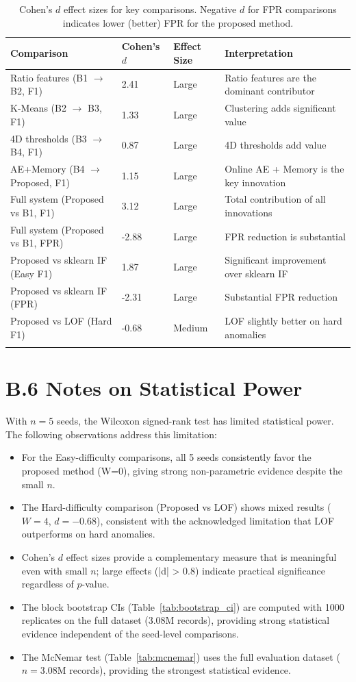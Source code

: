 \begin{longtable}{|m{4.5cm}|m{2cm}|m{2.5cm}|m{3cm}|}
\hline
\textbf{Comparison} & \textbf{Cohen's $d$} & \textbf{Effect Size} & \textbf{Interpretation} \\ \hline
Ratio features (B1 $\to$ B2, F1) & 2.41 & Large & Ratio features are the dominant contributor \\ \hline
K-Means (B2 $\to$ B3, F1) & 1.33 & Large & Clustering adds significant value \\ \hline
4D thresholds (B3 $\to$ B4, F1) & 0.87 & Large & 4D thresholds add value \\ \hline
AE+Memory (B4 $\to$ Proposed, F1) & 1.15 & Large & Online AE + Memory is the key innovation \\ \hline
Full system (Proposed vs B1, F1) & 3.12 & Large & Total contribution of all innovations \\ \hline
Full system (Proposed vs B1, FPR) & -2.88 & Large & FPR reduction is substantial \\ \hline
Proposed vs sklearn IF (Easy F1) & 1.87 & Large & Significant improvement over sklearn IF \\ \hline
Proposed vs sklearn IF (FPR) & -2.31 & Large & Substantial FPR reduction \\ \hline
Proposed vs LOF (Hard F1) & -0.68 & Medium & LOF slightly better on hard anomalies \\ \hline
\caption{Cohen's $d$ effect sizes for key comparisons. Negative $d$ for FPR comparisons indicates lower (better) FPR for the proposed method.}
\label{tab:cohen_d}
\end{longtable}

\vfill
\section*{B.6 Notes on Statistical Power}

With $n=5$ seeds, the Wilcoxon signed-rank test has limited statistical power. The following observations address this limitation:

\begin{itemize}
    \item For the Easy-difficulty comparisons, all 5 seeds consistently favor the proposed method (W=0), giving strong non-parametric evidence despite the small $n$.
    \item The Hard-difficulty comparison (Proposed vs LOF) shows mixed results ($W=4$, $d=-0.68$), consistent with the acknowledged limitation that LOF outperforms on hard anomalies.
    \item Cohen's $d$ effect sizes provide a complementary measure that is meaningful even with small $n$; large effects (|d| > 0.8) indicate practical significance regardless of $p$-value.
    \item The block bootstrap CIs (Table~\ref{tab:bootstrap_ci}) are computed with 1000 replicates on the full dataset (3.08M records), providing strong statistical evidence independent of the seed-level comparisons.
    \item The McNemar test (Table~\ref{tab:mcnemar}) uses the full evaluation dataset ($n=3.08$M records), providing the strongest statistical evidence.
\end{itemize}
